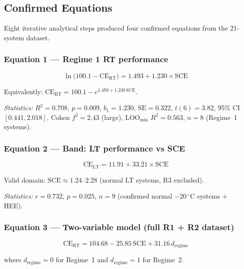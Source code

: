 \documentclass[12pt,letterpaper]{article}
\newcommand{\mSCE}{\mathrm{SCE}}
\newcommand{\mCERT}{\mathrm{CE}_{\mathrm{RT}}}
\newcommand{\mCELT}{\mathrm{CE}_{\mathrm{LT}}}
\begin{document}
\subsection{Confirmed Equations}
\label{sec:equations}

Eight iterative analytical steps produced four confirmed
equations from the 21-system dataset.

\subsubsection*{Equation 1 --- Regime 1 RT performance}

\begin{equation}
  \ln\!\bigl(100.1 - \mCERT\bigr)
  = 1.493 + 1.230 \times \mSCE
  \label{eq:eq1}
\end{equation}

\noindent Equivalently:
$\mCERT = 100.1 - e^{1.493 + 1.230\,\mSCE}$.

\medskip\noindent
\textit{Statistics:} $R^{2} = 0.708$, $p = 0.009$,
$b_1 = 1.230$, $\mathrm{SE} = 0.322$,
$t(6) = 3.82$, 95\% CI $[0.441, 2.018]$,
Cohen $f^{2} = 2.43$ (large),
$\mathrm{LOO}_{\min}$ $R^{2} = 0.563$,
$n = 8$ (Regime~1 systems).

\subsubsection*{Equation 2 --- Band: LT performance vs SCE}

\begin{equation}
  \mCELT = 11.91 + 33.21 \times \mSCE
  \label{eq:eq2}
\end{equation}

\noindent Valid domain: $\mSCE \approx 1.24$--$2.28$
(normal LT systems, R3 excluded).

\medskip\noindent
\textit{Statistics:} $r = 0.732$, $p = 0.025$,
$n = 9$ (confirmed normal $-20\,^{\circ}\mathrm{C}$
systems + HEE).

\subsubsection*{Equation 3 --- Two-variable model
(full R1 + R2 dataset)}

\begin{equation}
  \mCERT = 104.68
           - 25.85\,\mSCE
           + 31.16\,d_{\mathrm{regime}}
  \label{eq:eq3}
\end{equation}

\noindent where $d_{\mathrm{regime}} = 0$ for Regime~1
and $d_{\mathrm{regime}} = 1$ for Regime~2.
\end{document}
